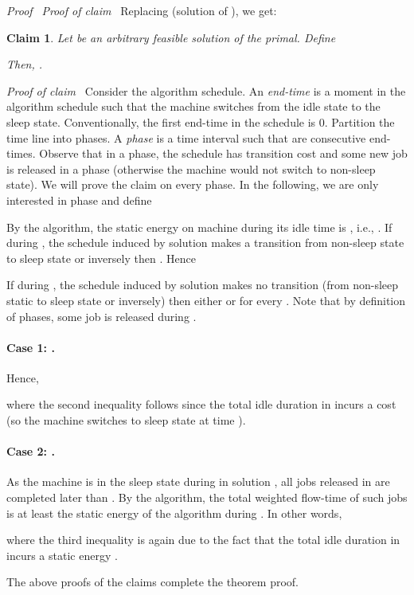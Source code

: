 \documentclass[11pt]{article}
\newenvironment{proof}{\noindent\emph{Proof\ }}{\hspace*{\fill}\medskip}
\newenvironment{claimproof}{\noindent\emph{Proof of claim\ }}{\hspace*{\fill}\medskip}
\newtheorem{claim}{Claim}
\begin{document}
\begin{proof}
\begin{claimproof}
Replacing 
(solution of ), 
we get:

\end{claimproof}

\begin{claim}		\label{claim:general-energy-L2}
Let  be an arbitrary feasible solution of the primal. 
Define

Then, .
\end{claim}
\begin{claimproof}
Consider the algorithm schedule. An \emph{end-time}  is a moment in the algorithm schedule such
that the machine switches from the idle state to the sleep state. 
Conventionally, the first end-time in the schedule is 0. 
Partition the time line into phases. A \emph{phase}  is a time interval such that 
are consecutive end-times. Observe that in a phase, the schedule
has transition cost  and some new job is released in a phase
(otherwise the machine would not switch to non-sleep state).
We will prove the claim on every phase. In the following, 
we are only interested in phase  and define 



By the algorithm, the static energy on machine  during 
its idle time is , i.e., . 
If during , the schedule induced by solution  makes a transition from
non-sleep state to sleep state or inversely then 
. Hence



If during , the schedule induced by solution  makes no transition (from
non-sleep static to sleep state or inversely) then either  or  for every 
. Note that by definition of phases, some job is released during .

\paragraph{Case 1: .} 
Hence,

where the second inequality follows since the total idle duration in  incurs a cost 
(so the machine switches to sleep state at time ).

\paragraph{Case 2: .}  As the machine is in the sleep state 
during  in solution , all jobs 
released in  are completed later than . 
By the algorithm, the total weighted flow-time of such jobs is at least the static energy of the algorithm
during . In other words,

where the third inequality is again due to the fact that 
the total idle duration in  incurs a static energy . 
\end{claimproof}

The above proofs of the claims complete the theorem proof.
\end{proof}
\end{document}
